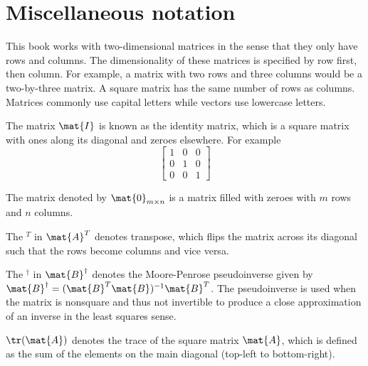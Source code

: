 \section{Miscellaneous notation}

This book works with two-dimensional matrices in the sense that they only have
rows and columns. The dimensionality of these matrices is specified by row
first, then column. For example, a matrix with two rows and three columns would
be a two-by-three matrix. A square matrix has the same number of rows as
columns. Matrices commonly use capital letters while vectors use lowercase
letters.

The matrix $\mat{I}$ is known as the identity matrix, which is a square matrix
with ones along its diagonal and zeroes elsewhere. For example
\begin{equation*}
  \begin{bmatrix}
    1 & 0 & 0 \\
    0 & 1 & 0 \\
    0 & 0 & 1
  \end{bmatrix}
\end{equation*}

The matrix denoted by $\mat{0}_{m \times n}$ is a matrix filled with zeroes with
$m$ rows and $n$ columns.

The $^T$ in $\mat{A}^T$ denotes transpose, which flips the matrix across its
diagonal such that the rows become columns and vice versa.

The $^\dagger$ in $\mat{B}^\dagger$ denotes the Moore-Penrose pseudoinverse
given by $\mat{B}^\dagger = (\mat{B}^T\mat{B})^{-1}\mat{B}^T$. The pseudoinverse
is used when the matrix is nonsquare and thus not invertible to produce a close
approximation of an inverse in the least squares sense.

$\tr(\mat{A})$ denotes the trace of the square matrix $\mat{A}$, which is
defined as the sum of the elements on the main diagonal (top-left to
bottom-right).
